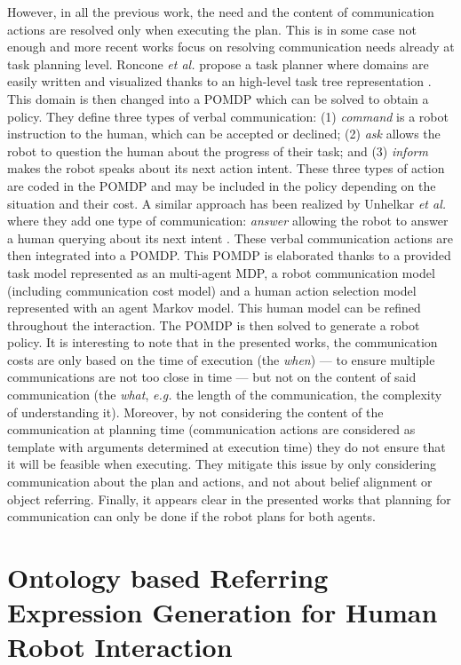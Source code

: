\documentclass[a4paper,11pt,twoside]{StyleThese}
\begin{document}
However, in all the previous work, the need and the content of communication actions are resolved only when executing the plan. This is in some case not enough and more recent works focus on resolving communication needs already at task planning level.
Roncone \textit{et al.} propose a task planner where domains are easily written and visualized thanks to an high-level task tree representation \cite{roncone2017transparent}. This domain is then changed into a POMDP which can be solved to obtain a policy. They define three types of verbal communication: (1) \textit{command} is a robot instruction to the human, which can be accepted or declined; (2) \textit{ask} allows the robot to question the human about the progress of their task; and (3) \textit{inform} makes the robot speaks about its next action intent. These three types of action are coded in the POMDP and may be included in the policy depending on the situation and their cost.
A similar approach has been realized by Unhelkar \textit{et al.} where they add one type of communication: \textit{answer} allowing the robot to answer a human querying about its next intent \cite{unhelkar2020decision}. These verbal communication actions are then integrated into a POMDP. This POMDP is elaborated thanks to a provided task model represented as an multi-agent MDP, a robot communication model (including communication cost model) and a human action selection model represented with an agent Markov model. This human model can be refined throughout the interaction. The POMDP is then solved to generate a robot policy.
It is interesting to note that in the presented works, the communication costs are only based on the time of execution (the \textit{when}) --- to ensure multiple communications are not too close in time --- but not on the content of said communication (the \textit{what}, \textit{e.g.} the length of the communication, the complexity of understanding it). Moreover, by not considering the content of the communication at planning time (communication actions are considered as template with arguments determined at execution time) they do not ensure that it will be feasible when executing. They mitigate this issue by only considering communication about the plan and actions, and not about belief alignment or object referring.
Finally, it appears clear in the presented works that planning for communication can only be done if the robot plans for both agents.


\section{Ontology based Referring Expression Generation for Human Robot Interaction}
\end{document}
